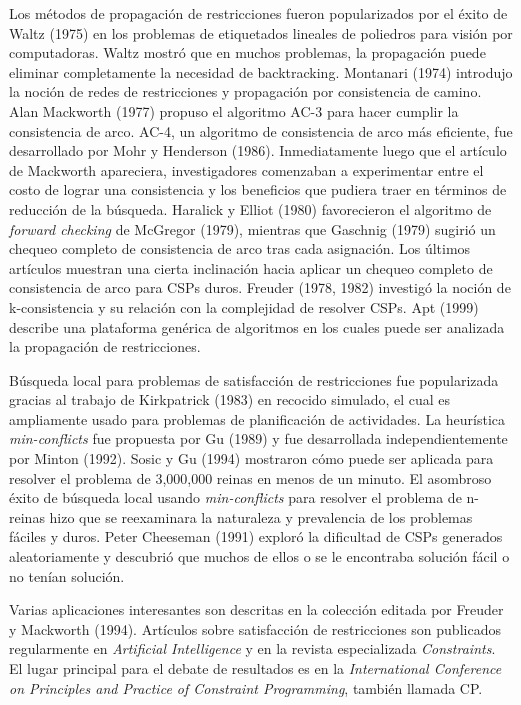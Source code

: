 Los m\'etodos de propagaci\'on de restricciones fueron popularizados por el \'exito de Waltz (1975) en los problemas de etiquetados lineales de poliedros para visi\'on por computadoras. Waltz mostr\'o que en muchos problemas, la propagaci\'on puede eliminar completamente la necesidad de backtracking. Montanari (1974) introdujo la noci\'on de redes de restricciones y propagaci\'on por consistencia de camino. Alan Mackworth (1977) propuso el algoritmo AC-3 para hacer cumplir la consistencia de arco. AC-4, un algoritmo de consistencia de arco m\'as eficiente, fue desarrollado por Mohr y Henderson (1986). Inmediatamente luego que el art\'iculo de Mackworth apareciera, investigadores comenzaban a experimentar entre el costo de lograr una consistencia y los beneficios que pudiera traer en t\'erminos de reducci\'on de la b\'usqueda. Haralick y Elliot (1980) favorecieron el algoritmo de \emph{forward checking} de McGregor (1979), mientras que Gaschnig (1979) sugiri\'o un chequeo completo de consistencia de arco tras cada asignaci\'on. Los \'ultimos art\'iculos muestran una cierta inclinaci\'on hacia aplicar un chequeo completo de consistencia de arco para CSPs duros. Freuder (1978, 1982) investig\'o la noci\'on de k-consistencia y su relaci\'on con la complejidad de resolver CSPs. Apt (1999) describe una plataforma gen\'erica de algoritmos en los cuales puede ser analizada la propagaci\'on de restricciones.

B\'usqueda local para problemas de satisfacci\'on de restricciones fue popularizada gracias al trabajo de Kirkpatrick (1983) en recocido simulado, el cual es ampliamente usado para problemas de planificaci\'on de actividades. La heur\'istica \emph{min-conflicts} fue propuesta por Gu (1989) y fue desarrollada independientemente por Minton (1992). Sosic y Gu (1994) mostraron c\'omo puede ser aplicada para resolver el problema de 3,000,000 reinas en menos de un minuto. El asombroso \'exito de b\'usqueda local usando \emph{min-conflicts} para resolver el problema de n-reinas hizo que se reexaminara la naturaleza y prevalencia de los problemas f\'aciles y duros. Peter Cheeseman (1991) explor\'o la dificultad de CSPs generados aleatoriamente y descubri\'o que muchos de ellos o se le encontraba soluci\'on f\'acil o no ten\'ian soluci\'on.

Varias aplicaciones interesantes son descritas en la colecci\'on editada por Freuder y Mackworth (1994). Art\'iculos sobre satisfacci\'on de restricciones son publicados regularmente en \emph{Artificial Intelligence} y en la revista especializada \emph{Constraints}. El lugar principal para el debate de resultados es en la \emph{International Conference on Principles and Practice of Constraint Programming}, tambi\'en llamada CP.